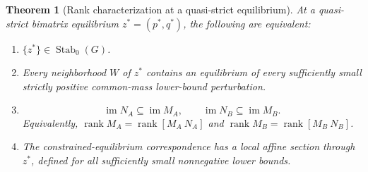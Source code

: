 \documentclass[11pt]{article}
\newcommand{\Stab}{\operatorname{Stab}_0}
\newcommand{\rank}{\operatorname{rank}}
\newcommand{\im}{\operatorname{im}}
\newtheorem{theorem}{Theorem}[section]
\theoremstyle{definition}
\theoremstyle{remark}
\begin{document}
\begin{theorem}[Rank characterization at a quasi-strict equilibrium]
\label{thm:rank}
At a quasi-strict bimatrix equilibrium $z^*=(p^*,q^*)$, the following are
equivalent:
\begin{enumerate}[label=(\roman*)]
\item $\{z^*\}\in\Stab(G)$.
\item Every neighborhood $W$ of $z^*$ contains an equilibrium of every
sufficiently small strictly positive common-mass lower-bound perturbation.
\item
\begin{equation}\label{eq:rankcondition}
 \im N_A\subseteq\im M_A,\qquad \im N_B\subseteq\im M_B.
\end{equation}
Equivalently, $\rank M_A=\rank[M_A\ N_A]$ and
$\rank M_B=\rank[M_B\ N_B]$.
\item The constrained-equilibrium correspondence has a local affine section
through $z^*$, defined for all sufficiently small nonnegative lower bounds.
\end{enumerate}
\end{theorem}
\end{document}
